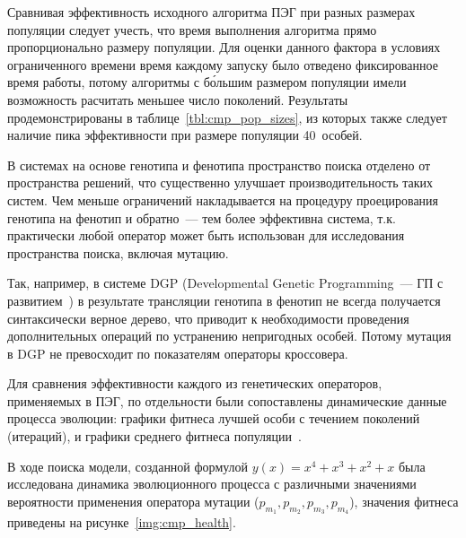 Сравнивая эффективность исходного алгоритма ПЭГ при разных размерах популяции следует учесть, что время выполнения алгоритма прямо пропорционально размеру популяции. Для оценки данного фактора в условиях ограниченного времени время каждому запуску было отведено фиксированное время работы, потому алгоритмы с б\'{о}льшим размером популяции имели возможность расчитать меньшее число поколений. Результаты продемонстрированы в таблице~\ref{tbl:cmp_pop_sizes}, из которых также следует наличие пика эффективности при размере популяции 40~особей.



В системах на основе генотипа и фенотипа пространство поиска отделено от пространства решений, что существенно улучшает производительность таких систем. Чем меньше ограничений накладывается на процедуру проецирования генотипа на фенотип и обратно~--- тем более эффективна система, т.к. практически любой оператор может быть использован для исследования пространства поиска, включая мутацию.

Так, например, в системе DGP (Developmental Genetic Programming~--- ГП с развитием~\cite{poli2008field}) в результате трансляции генотипа в фенотип не всегда получается синтаксически верное дерево, что приводит к необходимости проведения дополнительных операций по устранению непригодных особей. Потому мутация в DGP не превосходит по показателям операторы кроссовера.

Для сравнения эффективности каждого из генетических операторов, применяемых в ПЭГ, по отдельности были сопоставлены динамические данные процесса эволюции: графики фитнеса лучшей особи с течением поколений (итераций), и графики среднего фитнеса популяции~\cite{ferreira:2002:FEA}.

В ходе поиска модели, созданной формулой $y(x) = x^4 + x^3 + x^2 + x$ была исследована динамика эволюционного процесса с различными значениями вероятности применения оператора мутации ($p_{m_1}, p_{m_2}, p_{m_3}, p_{m_4}$), значения фитнеса приведены на рисунке~\ref{img:cmp_health}.

